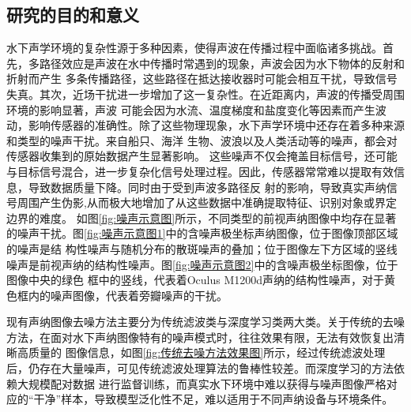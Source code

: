 \subsection{研究的目的和意义}

水下声学环境的复杂性源于多种因素，使得声波在传播过程中面临诸多挑战。首先，多路径效应是声波在水中传播时常遇到的现象，声波会因为水下物体的反射和折射而产生
多条传播路径，这些路径在抵达接收器时可能会相互干扰，导致信号失真。其次，近场干扰进一步增加了这一复杂性。在近距离内，声波的传播受周围环境的影响显著，声波
可能会因为水流、温度梯度和盐度变化等因素而产生波动，影响传感器的准确性。除了这些物理现象，水下声学环境中还存在着多种来源和类型的噪声干扰。来自船只、海洋
生物、波浪以及人类活动等的噪声，都会对传感器收集到的原始数据产生显著影响。
这些噪声不仅会掩盖目标信号，还可能与目标信号混合，进一步复杂化信号处理过程。因此，传感器常常难以提取有效信息，导致数据质量下降。同时由于受到声波多路径反
射的影响，导致真实声纳信号周围产生伪影\cite{cervenka2002sidescan},从而极大地增加了从这些数据中准确提取特征、识别对象或界定边界的难度。
如图\ref{fig:噪声示意图}所示，不同类型的前视声纳图像中均存在显著的噪声干扰。图\ref{fig:噪声示意图1}中的含噪声极坐标声纳图像，位于图像顶部区域的噪声是结
构性噪声与随机分布的散斑噪声的叠加；位于图像左下方区域的竖线噪声是前视声纳的结构性噪声。图\ref{fig:噪声示意图2}中的含噪声极坐标图像，位于图像中央的绿色
框中的竖线，代表着Oculus M1200d声纳的结构性噪声，对于黄色框内的噪声图像，代表着旁瓣噪声的干扰。

现有声纳图像去噪方法主要分为传统滤波类与深度学习类两大类。关于传统的去噪方法，在面对水下声纳图像特有的噪声模式时，往往效果有限，无法有效恢复出清晰高质量的
图像信息，如图\ref{fig:传统去噪方法效果图}所示，经过传统滤波处理后，仍存在大量噪声，可见传统滤波处理算法的鲁棒性较差。而深度学习的方法依赖大规模配对数据
进行监督训练，而真实水下环境中难以获得与噪声图像严格对应的“干净”样本，导致模型泛化性不足，难以适用于不同声纳设备与环境条件。


